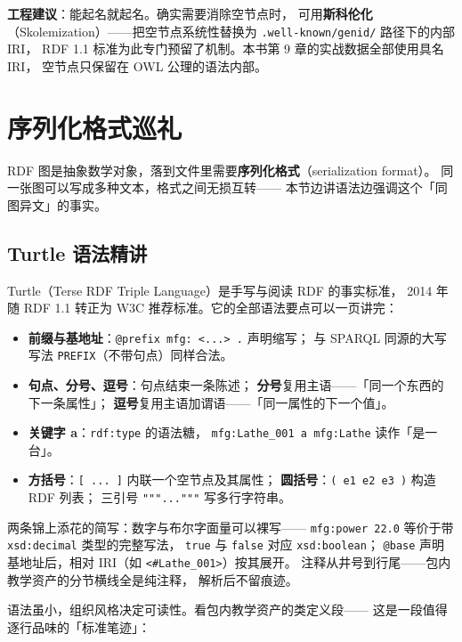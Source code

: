 \begin{noteblock}
\textbf{工程建议}：能起名就起名。确实需要消除空节点时，
可用\textbf{斯科伦化}（Skolemization）——把空节点系统性替换为
\texttt{.well-known/genid/} 路径下的内部 IRI，
RDF 1.1 标准为此专门预留了机制。本书第 9 章的实战数据全部使用具名 IRI，
空节点只保留在 OWL 公理的语法内部。
\end{noteblock}

\section{序列化格式巡礼}

RDF 图是抽象数学对象，落到文件里需要\textbf{序列化格式}（serialization format）。
同一张图可以写成多种文本，格式之间无损互转——
本节边讲语法边强调这个「同图异文」的事实。

\subsection{Turtle 语法精讲}

Turtle（Terse RDF Triple Language）是手写与阅读 RDF 的事实标准，
2014 年随 RDF 1.1 转正为 W3C 推荐标准。它的全部语法要点可以一页讲完：

\begin{itemize}
  \item \textbf{前缀与基地址}：\texttt{@prefix mfg: <...> .} 声明缩写；
        与 SPARQL 同源的大写写法 \texttt{PREFIX}（不带句点）同样合法。
  \item \textbf{句点、分号、逗号}：句点结束一条陈述；
        \textbf{分号}复用主语——「同一个东西的下一条属性」；
        \textbf{逗号}复用主语加谓语——「同一属性的下一个值」。
  \item \textbf{关键字 a}：\texttt{rdf:type} 的语法糖，
        \texttt{mfg:Lathe\_001 a mfg:Lathe} 读作「是一台」。
  \item \textbf{方括号}：\texttt{[ ... ]} 内联一个空节点及其属性；
        \textbf{圆括号}：\texttt{( e1 e2 e3 )} 构造 RDF 列表；
        三引号 \texttt{"""..."""} 写多行字符串。
\end{itemize}

两条锦上添花的简写：数字与布尔字面量可以裸写——
\texttt{mfg:power 22.0} 等价于带 \texttt{xsd:decimal} 类型的完整写法，
\texttt{true} 与 \texttt{false} 对应 \texttt{xsd:boolean}；
\texttt{@base} 声明基地址后，相对 IRI（如 \texttt{<\#Lathe\_001>}）按其展开。
注释从井号到行尾——包内教学资产的分节横线全是纯注释，
解析后不留痕迹。

语法虽小，组织风格决定可读性。看包内教学资产的类定义段——
这是一段值得逐行品味的「标准笔迹」：

